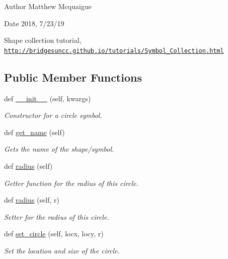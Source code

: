 \begin{DoxyAuthor}{Author}
Matthew Mcquaigue 
\end{DoxyAuthor}
\begin{DoxyDate}{Date}
2018, 7/23/19
\end{DoxyDate}
Shape collection tutorial, \href{http://bridgesuncc.github.io/tutorials/Symbol_Collection.html}{\tt http\+://bridgesuncc.\+github.\+io/tutorials/\+Symbol\+\_\+\+Collection.\+html} \subsection*{Public Member Functions}
\begin{DoxyCompactItemize}
\item 
def \hyperlink{classbridges_1_1circle_1_1_circle_a04dfb68bb632534cf715e2ce927cc76a}{\+\_\+\+\_\+init\+\_\+\+\_\+} (self, kwargs)
\begin{DoxyCompactList}\small\item\em Constructor for a circle symbol. \end{DoxyCompactList}\item 
def \hyperlink{classbridges_1_1circle_1_1_circle_acacc4d8cc5f2db86cfcba61f31652003}{get\+\_\+name} (self)
\begin{DoxyCompactList}\small\item\em Gets the name of the shape/symbol. \end{DoxyCompactList}\item 
def \hyperlink{classbridges_1_1circle_1_1_circle_abc82c7f3e8ac6112167b396839863319}{radius} (self)
\begin{DoxyCompactList}\small\item\em Getter function for the radius of this circle. \end{DoxyCompactList}\item 
def \hyperlink{classbridges_1_1circle_1_1_circle_ae7c2dc54c90d954626f99d7561009587}{radius} (self, r)
\begin{DoxyCompactList}\small\item\em Setter for the radius of this circle. \end{DoxyCompactList}\item 
def \hyperlink{classbridges_1_1circle_1_1_circle_a42b7ccd17017ca328371ce27e1bdbffe}{set\+\_\+circle} (self, locx, locy, r)
\begin{DoxyCompactList}\small\item\em Set the location and size of the circle. \end{DoxyCompactList}\item 

\end{DoxyCompactItemize}
